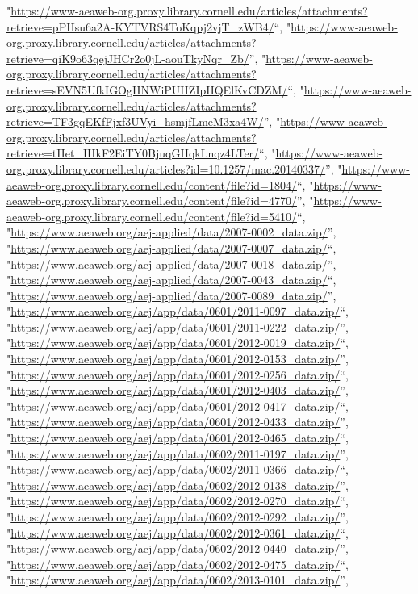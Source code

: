 \documentclass[]{article}
\begin{document}
\begin{itemize}
  "\url{https://www-aeaweb-org.proxy.library.cornell.edu/articles/attachments?retrieve=pPHsu6a2A-KYTVRS4ToKqpj2vjT_zWB4/}``,
  "\url{https://www-aeaweb-org.proxy.library.cornell.edu/articles/attachments?retrieve=qiK9o63qejJHCr2o0jL-aouTkyNqr_Zb/}'',
  "\url{https://www-aeaweb-org.proxy.library.cornell.edu/articles/attachments?retrieve=sEVN5UfkIGOgHNWiPUHZIpHQElKvCDZM/}``,
  "\url{https://www-aeaweb-org.proxy.library.cornell.edu/articles/attachments?retrieve=TF3gqEKfFjxf3UVyi_hsmjfLmeM3xa4W/}'',
  "\url{https://www-aeaweb-org.proxy.library.cornell.edu/articles/attachments?retrieve=tHet_IHkF2EiTY0BjuqGHqkLnqz4LTer/}``,
  "\url{https://www-aeaweb-org.proxy.library.cornell.edu/articles?id=10.1257/mac.20140337/}'',
  "\url{https://www-aeaweb-org.proxy.library.cornell.edu/content/file?id=1804/}``,
  "\url{https://www-aeaweb-org.proxy.library.cornell.edu/content/file?id=4770/}'',
  "\url{https://www-aeaweb-org.proxy.library.cornell.edu/content/file?id=5410/}``,
  "\url{https://www.aeaweb.org/aej-applied/data/2007-0002_data.zip/}'',
  "\url{https://www.aeaweb.org/aej-applied/data/2007-0007_data.zip/}``,
  "\url{https://www.aeaweb.org/aej-applied/data/2007-0018_data.zip/}'',
  "\url{https://www.aeaweb.org/aej-applied/data/2007-0043_data.zip/}``,
  "\url{https://www.aeaweb.org/aej-applied/data/2007-0089_data.zip/}'',
  "\url{https://www.aeaweb.org/aej/app/data/0601/2011-0097_data.zip/}``,
  "\url{https://www.aeaweb.org/aej/app/data/0601/2011-0222_data.zip/}'',
  "\url{https://www.aeaweb.org/aej/app/data/0601/2012-0019_data.zip/}``,
  "\url{https://www.aeaweb.org/aej/app/data/0601/2012-0153_data.zip/}'',
  "\url{https://www.aeaweb.org/aej/app/data/0601/2012-0256_data.zip/}``,
  "\url{https://www.aeaweb.org/aej/app/data/0601/2012-0403_data.zip/}'',
  "\url{https://www.aeaweb.org/aej/app/data/0601/2012-0417_data.zip/}``,
  "\url{https://www.aeaweb.org/aej/app/data/0601/2012-0433_data.zip/}'',
  "\url{https://www.aeaweb.org/aej/app/data/0601/2012-0465_data.zip/}``,
  "\url{https://www.aeaweb.org/aej/app/data/0602/2011-0197_data.zip/}'',
  "\url{https://www.aeaweb.org/aej/app/data/0602/2011-0366_data.zip/}``,
  "\url{https://www.aeaweb.org/aej/app/data/0602/2012-0138_data.zip/}'',
  "\url{https://www.aeaweb.org/aej/app/data/0602/2012-0270_data.zip/}``,
  "\url{https://www.aeaweb.org/aej/app/data/0602/2012-0292_data.zip/}'',
  "\url{https://www.aeaweb.org/aej/app/data/0602/2012-0361_data.zip/}``,
  "\url{https://www.aeaweb.org/aej/app/data/0602/2012-0440_data.zip/}'',
  "\url{https://www.aeaweb.org/aej/app/data/0602/2012-0475_data.zip/}``,
  "\url{https://www.aeaweb.org/aej/app/data/0602/2013-0101_data.zip/}'',

\end{itemize}
\end{document}
